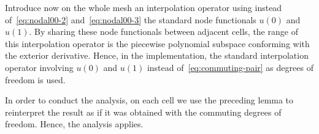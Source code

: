 \documentclass[final]{amsart}%
\newcommand{\0}{\mathaccent23}
\begin{document}
Introduce now on the whole mesh an interpolation operator using instead of~\eqref{eq:nodal00-2} and~\eqref{eq:nodal00-3} the standard node functionals $u(0)$ and $u(1)$.
By sharing these node functionals between adjacent cells, the range of this interpolation operator is the piecewise polynomial subspace conforming with the exterior derivative.
Hence, in the implementation, the standard interpolation operator involving $u(0)$ and $u(1)$ instead of~\eqref{eq:commuting-pair} as degrees of freedom is used.

In order to conduct the analysis, on each cell we use the preceding lemma to reinterpret the result as if it was obtained with the commuting degrees of freedom. Hence, the analysis applies.

\color{black}

% 
{}   %
\end{document}
